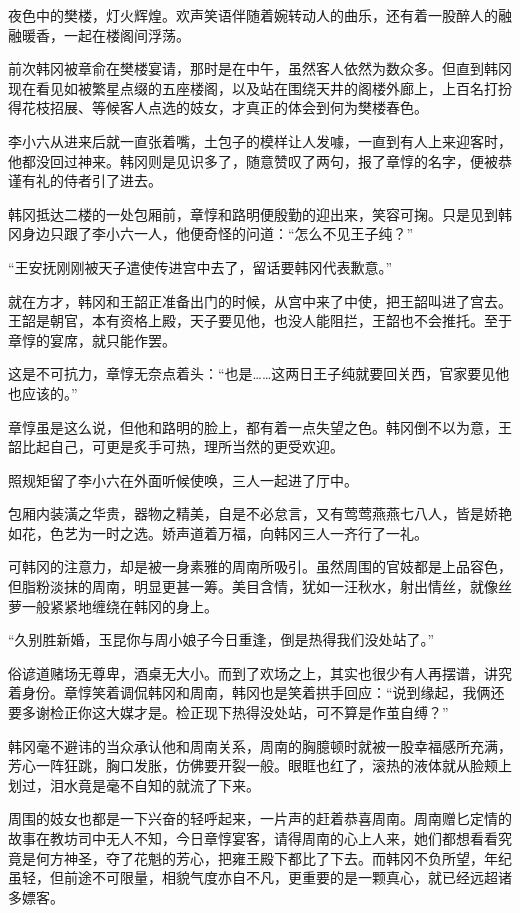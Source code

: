 夜色中的樊楼，灯火辉煌。欢声笑语伴随着婉转动人的曲乐，还有着一股醉人的融融暖香，一起在楼阁间浮荡。

前次韩冈被章俞在樊楼宴请，那时是在中午，虽然客人依然为数众多。但直到韩冈现在看见如被繁星点缀的五座楼阁，以及站在围绕天井的阁楼外廊上，上百名打扮得花枝招展、等候客人点选的妓女，才真正的体会到何为樊楼春色。

李小六从进来后就一直张着嘴，土包子的模样让人发噱，一直到有人上来迎客时，他都没回过神来。韩冈则是见识多了，随意赞叹了两句，报了章惇的名字，便被恭谨有礼的侍者引了进去。

韩冈抵达二楼的一处包厢前，章惇和路明便殷勤的迎出来，笑容可掬。只是见到韩冈身边只跟了李小六一人，他便奇怪的问道：“怎么不见王子纯？”

“王安抚刚刚被天子遣使传进宫中去了，留话要韩冈代表歉意。”

就在方才，韩冈和王韶正准备出门的时候，从宫中来了中使，把王韶叫进了宫去。王韶是朝官，本有资格上殿，天子要见他，也没人能阻拦，王韶也不会推托。至于章惇的宴席，就只能作罢。

这是不可抗力，章惇无奈点着头：“也是……这两日王子纯就要回关西，官家要见他也应该的。”

章惇虽是这么说，但他和路明的脸上，都有着一点失望之色。韩冈倒不以为意，王韶比起自己，可更是炙手可热，理所当然的更受欢迎。

照规矩留了李小六在外面听候使唤，三人一起进了厅中。

包厢内装潢之华贵，器物之精美，自是不必怠言，又有莺莺燕燕七八人，皆是娇艳如花，色艺为一时之选。娇声道着万福，向韩冈三人一齐行了一礼。

可韩冈的注意力，却是被一身素雅的周南所吸引。虽然周围的官妓都是上品容色，但脂粉淡抹的周南，明显更甚一筹。美目含情，犹如一汪秋水，射出情丝，就像丝萝一般紧紧地缠绕在韩冈的身上。

“久别胜新婚，玉昆你与周小娘子今日重逢，倒是热得我们没处站了。”

俗谚道赌场无尊卑，酒桌无大小。而到了欢场之上，其实也很少有人再摆谱，讲究着身份。章惇笑着调侃韩冈和周南，韩冈也是笑着拱手回应：“说到缘起，我俩还要多谢检正你这大媒才是。检正现下热得没处站，可不算是作茧自缚？”

韩冈毫不避讳的当众承认他和周南关系，周南的胸臆顿时就被一股幸福感所充满，芳心一阵狂跳，胸口发胀，仿佛要开裂一般。眼眶也红了，滚热的液体就从脸颊上划过，泪水竟是毫不自知的就流了下来。

周围的妓女也都是一下兴奋的轻呼起来，一片声的赶着恭喜周南。周南赠匕定情的故事在教坊司中无人不知，今日章惇宴客，请得周南的心上人来，她们都想看看究竟是何方神圣，夺了花魁的芳心，把雍王殿下都比了下去。而韩冈不负所望，年纪虽轻，但前途不可限量，相貌气度亦自不凡，更重要的是一颗真心，就已经远超诸多嫖客。

